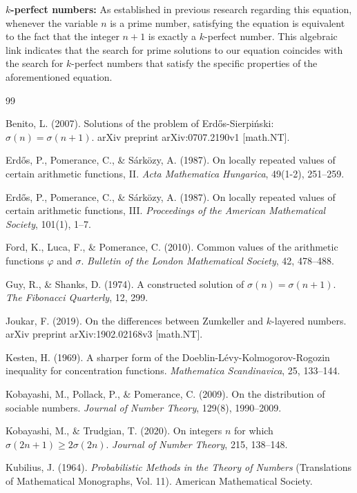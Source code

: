 \documentclass[12pt, a4paper]{article}
\theoremstyle{plain}
\theoremstyle{definition}
\begin{document}
\textbf{$k$-perfect numbers:} As established in previous research regarding this equation, whenever the variable $n$ is a prime number, satisfying the equation is equivalent to the fact that the integer $n + 1$ is exactly a $k$-perfect number. This algebraic link indicates that the search for prime solutions to our equation coincides with the search for $k$-perfect numbers that satisfy the specific properties of the aforementioned equation.

\renewcommand{\refname}{References}
\begin{thebibliography}{99}

Benito, L. (2007). Solutions of the problem of Erdős-Sierpiński: $\sigma(n)=\sigma(n+1)$. arXiv preprint arXiv:0707.2190v1 [math.NT].

Erdős, P., Pomerance, C., \& Sárközy, A. (1987). On locally repeated values of certain arithmetic functions, II. \textit{Acta Mathematica Hungarica}, 49(1-2), 251--259.

Erdős, P., Pomerance, C., \& Sárközy, A. (1987). On locally repeated values of certain arithmetic functions, III. \textit{Proceedings of the American Mathematical Society}, 101(1), 1--7.

Ford, K., Luca, F., \& Pomerance, C. (2010). Common values of the arithmetic functions $\varphi$ and $\sigma$. \textit{Bulletin of the London Mathematical Society}, 42, 478--488.

Guy, R., \& Shanks, D. (1974). A constructed solution of $\sigma(n)=\sigma(n+1)$. \textit{The Fibonacci Quarterly}, 12, 299.

Joukar, F. (2019). On the differences between Zumkeller and $k$-layered numbers. arXiv preprint arXiv:1902.02168v3 [math.NT].

Kesten, H. (1969). A sharper form of the Doeblin-Lévy-Kolmogorov-Rogozin inequality for concentration functions. \textit{Mathematica Scandinavica}, 25, 133--144.

Kobayashi, M., Pollack, P., \& Pomerance, C. (2009). On the distribution of sociable numbers. \textit{Journal of Number Theory}, 129(8), 1990--2009.

Kobayashi, M., \& Trudgian, T. (2020). On integers $n$ for which $\sigma(2n + 1) \geq 2\sigma(2n)$. \textit{Journal of Number Theory}, 215, 138--148.

Kubilius, J. (1964). \textit{Probabilistic Methods in the Theory of Numbers} (Translations of Mathematical Monographs, Vol. 11). American Mathematical Society.


\end{thebibliography}
\end{document}

